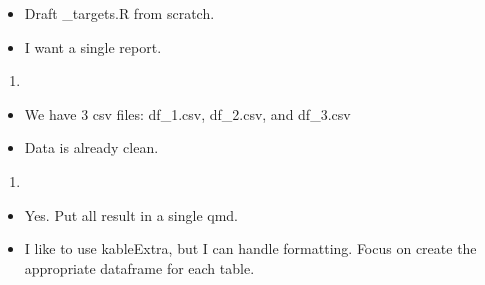 \documentclass[
  letterpaper,
]{article}
\providecommand{\tightlist}{%
  \setlength{\itemsep}{0pt}\setlength{\parskip}{0pt}}
\begin{document}
\begin{itemize}
\tightlist
\item
  Draft \_targets.R from scratch.
\item
  I want a single report.
\end{itemize}

\begin{enumerate}
\def\labelenumi{\arabic{enumi}.}
\setcounter{enumi}{4}
\tightlist
\item
\end{enumerate}

\begin{itemize}
\tightlist
\item
  We have 3 csv files: df\_1.csv, df\_2.csv, and df\_3.csv
\item
  Data is already clean.
\end{itemize}

\begin{enumerate}
\def\labelenumi{\arabic{enumi}.}
\setcounter{enumi}{5}
\tightlist
\item
\end{enumerate}

\begin{itemize}
\tightlist
\item
  Yes. Put all result in a single qmd.
\item
  I like to use kableExtra, but I can handle formatting. Focus on create
  the appropriate dataframe for each table.
\end{itemize}
\end{document}

